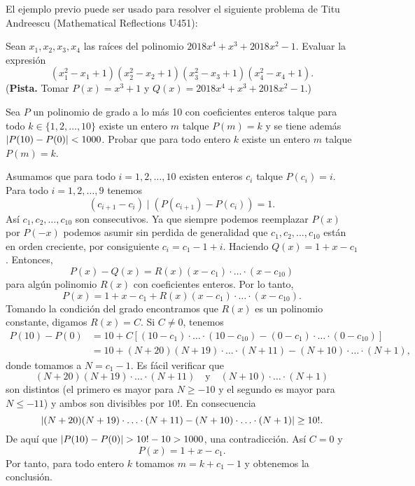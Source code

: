 \begin{note}
    El ejemplo previo puede ser usado para resolver el siguiente problema de Titu Andreescu (Mathematical Reflections U451):

    Sean $x_1, x_2, x_3, x_4$ las raíces del polinomio $2018 x^4 + x^3 + 2018x^2 - 1$.
    Evaluar la expresión
    \[
        (x_1^2 - x_1 + 1)(x_2^2 - x_2 + 1)(x_3^2 - x_3 + 1)(x_4^2 - x_4 + 1).
    \]
    (\textbf{Pista.} Tomar $P(x) = x^3 + 1$ y $Q(x) = 2018x^4 + x^3 + 2018x^2 - 1$.)
\end{note}

\begin{example}
    Sea $P$ un polinomio de grado a lo más 10 con coeficientes enteros talque para todo $k \in \{1, 2, \ldots, 10\}$ existe un entero $m$ talque $P(m) = k$ y se tiene además $\lvert P(10) - P(0)\rvert < 1000$.
    Probar que para todo entero $k$ existe un entero $m$ talque $P(m) = k$.
\end{example}
\begin{solution}
    Asumamos que para todo $i = 1, 2, \ldots, 10$ existen enteros $c_i$ talque $P(c_i) = i$.
    Para todo $i = 1, 2, \ldots, 9$ tenemos
    \[
        (c_{i + 1} - c_i) \mid \left( P(c_{i + 1}) - P(c_i)\right) = 1.
    \]
    Así $c_1, c_2, \ldots, c_{10}$ son consecutivos.
    Ya que siempre podemos reemplazar $P(x)$ por $P(-x)$ podemos asumir sin perdida de generalidad que $c_1, c_2, \ldots, c_{10}$ están en orden creciente, por consiguiente $c_i = c_1 - 1 + i$.
    Haciendo $Q(x) = 1 + x - c_1$.
    Entonces,
    \[
        P(x) - Q(x) = R(x) (x - c_1) \cdot \ldots \cdot (x - c_{10})
    \]
    para algún polinomio $R(x)$ con coeficientes enteros.
    Por lo tanto,
    \[
        P(x) = 1 + x - c_1 + R(x) (x - c_1) \cdot \ldots \cdot (x - c_{10}).
    \]
    Tomando la condición del grado encontramos que $R(x)$ es un polinomio constante, digamos $R(x) = C$.
    Si $C \neq 0$, tenemos
    \begin{align*}
        P(10) - P(0) &= 10 + C\left[ (10 - c_1) \cdot \ldots \cdot (10 - c_{10}) - (0 - c_1) \cdot \ldots \cdot (0 - c_{10}) \right]\\
        &= 10 + (N + 20)(N + 19) \cdot \ldots \cdot (N + 11) - (N + 10) \cdot \ldots \cdot (N + 1),
    \end{align*}
    donde tomamos a $N = c_1 - 1$.
    Es fácil verificar que
    \[
        (N + 20)(N + 19) \cdot \ldots \cdot (N + 11) \quad \text{y} \quad (N + 10) \cdot \ldots \cdot (N + 1)
    \]
    son distintos (el primero es mayor para $N \geq -10$ y el segundo es mayor para $N \leq -11$) y ambos son divisibles por $10!$.
    En consecuencia
    \[
        \lvert(N + 20)(N + 19) \cdot \ldots \cdot (N + 11) - (N + 10) \cdot \ldots \cdot (N + 1)\rvert \geq 10!.
    \]
    De aquí que $\lvert P(10) - P(0)\rvert > 10! - 10 > 1000$, una contradicción.
    Así $C = 0$ y
    \[
        P(x) = 1 + x - c_1.
    \]
    Por tanto, para todo entero $k$ tomamos $m = k + c_1 - 1$ y obtenemos la conclusión.
\end{solution}

